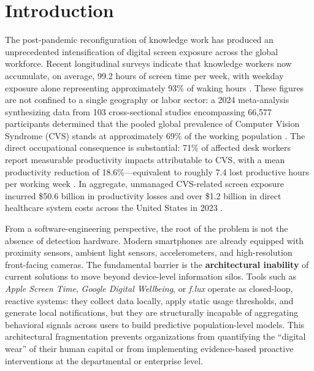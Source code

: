 \documentclass[conference]{IEEEtran}
\begin{document}
\section{Introduction}

The post-pandemic reconfiguration of knowledge work has produced an unprecedented
intensification of digital screen exposure across the global workforce. Recent longitudinal
surveys indicate that knowledge workers now accumulate, on average, 99.2 hours of screen
time per week, with weekday exposure alone representing approximately 93\% of waking
hours \cite{b17}. These figures are not confined to a single geography or labor sector:
a 2024 meta-analysis synthesizing data from 103 cross-sectional studies encompassing
66,577 participants determined that the pooled global prevalence of Computer Vision
Syndrome (CVS) stands at approximately 69\% of the working population \cite{b15}.
The direct occupational consequence is substantial: 71\% of affected desk workers report
measurable productivity impacts attributable to CVS, with a mean productivity reduction
of 18.6\%---equivalent to roughly 7.4 lost productive hours per working week
\cite{b17}. In aggregate, unmanaged CVS-related screen exposure incurred \$50.6 billion
in productivity losses and over \$1.2 billion in direct healthcare system costs across
the United States in 2023 \cite{b16}.

From a software-engineering perspective, the root of the problem is not the absence of
detection hardware. Modern smartphones are already equipped with proximity sensors,
ambient light sensors, accelerometers, and high-resolution front-facing cameras.
The fundamental barrier is the \textbf{architectural inability} of current solutions
to move beyond device-level information silos. Tools such as \textit{Apple Screen Time},
\textit{Google Digital Wellbeing}, or \textit{f.lux} operate as closed-loop, reactive
systems: they collect data locally, apply static usage thresholds, and generate local
notifications, but they are structurally incapable of aggregating behavioral signals
across users to build predictive population-level models. This architectural fragmentation
prevents organizations from quantifying the ``digital wear'' of their human capital or
from implementing evidence-based proactive interventions at the departmental or
enterprise level.
\end{document}
